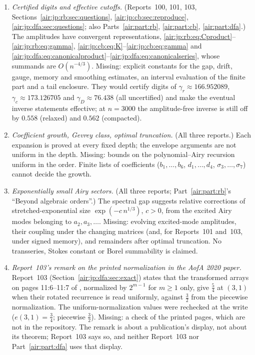 \documentclass[11pt,letterpaper]{article}
\numberwithin{equation}{section}
\theoremstyle{remark}
\begin{document}
\begin{enumerate}[label=\textbf{V.\arabic*}, ref=V.\arabic*, leftmargin=*]
\item\label{air:jp:q:certified} \emph{Certified digits and effective cutoffs.} (Reports~100, 101, 103, Sections~\ref{air:jp:rb:sec:questions}, \ref{air:jp:cb:sec:reproduce}, \ref{air:jp:dfa:sec:questions}; also Parts~\ref{air:part:rb}, \ref{air:part:cb}, \ref{air:part:dfa}.) The amplitudes have convergent representations, \eqref{air:jp:rb:eq:Cproduct}--\eqref{air:jp:rb:eq:gamma}, \eqref{air:jp:cb:eq:K}--\eqref{air:jp:cb:eq:gamma} and \eqref{air:jp:dfa:eq:canonicalproduct}--\eqref{air:jp:dfa:eq:canonicalseries}, whose summands are $O(n^{-4/3})$. Missing: explicit constants for the gap, drift, gauge, memory and smoothing estimates, an interval evaluation of the finite part and a tail enclosure. They would certify digits of $\gamma_r\approx166.952089$, $\gamma_c\approx173.126705$ and $\gamma_D\approx76.438$ (all uncertified) and make the eventual inverse statements effective; at $n=3000$ the amplitude-free inverse is still off by $0.558$ (relaxed) and $0.562$ (compacted).
\item\label{air:jp:q:gevrey} \emph{Coefficient growth, Gevrey class, optimal truncation.} (All three reports.) Each expansion is proved at every fixed depth; the envelope arguments are not uniform in the depth. Missing: bounds on the polynomial--Airy recursion uniform in the order. Finite lists of coefficients ($b_1,\ldots,b_6$, $d_1,\ldots,d_4$, $\sigma_3,\ldots,\sigma_7$) cannot decide the growth.
\item\label{air:jp:q:sectors} \emph{Exponentially small Airy sectors.} (All three reports; Part~\ref{air:part:rb}'s ``Beyond algebraic orders''.) The spectral gap suggests relative corrections of stretched-exponential size $\exp(-c\,n^{1/3})$, $c>0$, from the excited Airy modes belonging to $a_2,a_3,\ldots$. Missing: evolving excited-mode amplitudes, their coupling under the changing matrices (and, for Reports~101 and~103, under signed memory), and remainders after optimal truncation. No transseries, Stokes constant or Borel summability is claimed.
\item\label{air:jp:q:normalization} \emph{Report~103's remark on the printed normalization in the AofA 2020 paper.} Report~103 (Section~\ref{air:jp:dfa:sec:exact}) states that the transformed arrays on pages 11:6--11:7 of \cite{dfa}, normalized by $2^{m-1}$ for $m\ge1$ only, give $\frac54$ at $(3,1)$ when their rotated recurrence is read uniformly, against $\frac32$ from the piecewise normalization. The uniform-normalization values were rechecked at the write ($e(3,1)=\frac34$; piecewise $\frac32$). Missing: a check of the printed pages, which are not in the repository. The remark is about a publication's display, not about its theorem; Report~103 says so, and neither Report~103 nor Part~\ref{air:part:dfa} uses that display.

\end{enumerate}
\end{document}

